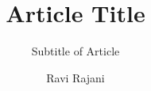 \documentclass[style=article]{tablet}
\title{Article Title}%
\subtitle{Subtitle of Article}
\author{Ravi Rajani}
\begin{document}
\def\subbib{}
\maketitle
%
\end{document}
